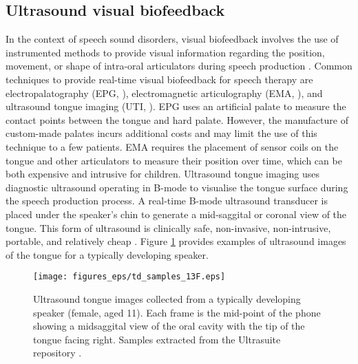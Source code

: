 \subsection{Ultrasound visual biofeedback}

In the context of speech sound disorders, visual biofeedback involves the use of instrumented methods to provide visual information regarding the position, movement, or shape of intra-oral articulators during speech production \citep{sugden2019systematic}.
Common techniques to provide real-time visual biofeedback for speech therapy are electropalatography (EPG, \cite{lee2009electropalatography}), electromagnetic articulography (EMA, \cite{katz2010treating}), and ultrasound tongue imaging (UTI, \cite{sugden2019systematic}).
EPG uses an artificial palate to measure the contact points between the tongue and hard palate.
However, the manufacture of custom-made palates incurs additional costs and may limit the use of this technique to a few patients.
EMA requires the placement of sensor coils on the tongue and other articulators to measure their position over time, which can be both expensive and intrusive for children.
Ultrasound tongue imaging uses diagnostic ultrasound operating in B-mode to visualise the tongue surface during the speech production process.
A real-time B-mode ultrasound transducer is placed under the speaker's chin to generate a mid-saggital or coronal view of the tongue.
This form of ultrasound is  clinically safe, non-invasive, non-intrusive, portable, and relatively cheap \citep{stone2005guide}.
Figure \ref{fig:td_samples} provides examples of ultrasound images of the tongue for a typically developing speaker.

\begin{figure}
\texttt{[image: figures\_eps/td\_samples\_13F.eps]}
\caption{Ultrasound tongue images collected from a typically developing speaker (female, aged 11). Each frame is the mid-point of the phone showing a midsaggital view of the oral cavity with the tip of the tongue facing right. Samples extracted from the Ultrasuite repository \citep{eshky2018ultrasuite}.}
\label{fig:td_samples}
\end{figure}


